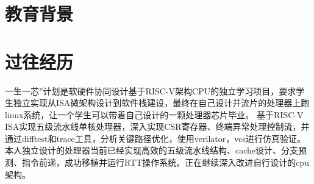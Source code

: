 \documentclass{resume}
\begin{document}




\sepspace
{}


\section{教育背景}

  


\section{过往经历}

\Content
{一生一芯”计划是软硬件协同设计基于RISC-V架构CPU的独立学习项目，要求学生独立实现从ISA微架构设计到软件栈建设，最终在自己设计并流片的处理器上跑linux系统，让一个学生可以带着自己设计的一颗处理器芯片毕业。}
{基于RISC-V ISA实现五级流水线单核处理器，深入实现CSR寄存器、终端异常处理控制流，并通过difftest和trace工具，分析关键路径优化，使用verilator，vcs进行仿真验证。}
{本人独立设计的处理器当前已经实现高效的五级流水线结构、cache设计、分支预测、指令前递，成功移植并运行RTT操作系统。正在继续深入改进自行设计的cpu架构。}
\end{document}
